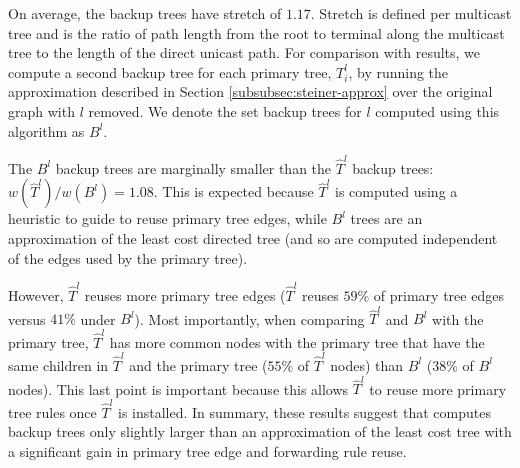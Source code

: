 On average, the \steiner backup trees have stretch of $1.17$. %
Stretch is defined per multicast tree and is the ratio of path length from the root to terminal along the multicast tree to the length of the direct unicast path. 
For comparison with \steiner results, we compute a second backup tree for each primary tree, $T_i^l$, 
by running the \arbor approximation described in Section \ref{subsubsec:steiner-approx} over the original graph with $l$ removed. We denote the set backup trees for $l$ computed using this algorithm
as $B^l$. 

The $B^l$ backup trees are marginally smaller than the $\hat{T}^l$ backup trees: $w(\hat{T}^l)/w(B^l) = 1.08$.  This is expected because $\hat{T}^l$ is computed using 
a heuristic to guide \steiner to reuse primary tree edges, while $B^l$ trees are an approximation of the least cost directed tree (and so are computed independent of the edges used by the primary tree). 

However, $\hat{T}^l$ reuses more primary tree edges ($\hat{T}^l$ reuses $59\%$ of primary tree edges versus $41\%$ under $B^l$). Most importantly, when comparing $\hat{T}^l$ and $B^l$ with 
the primary tree, $\hat{T}^l$ has more common nodes with the primary tree that have the same children in $\hat{T}^l$ and the primary tree ($55\%$ of $\hat{T}^l$ nodes) 
than $B^l$ ($38\%$ of $B^l$ nodes).  
This last point is important because this allows $\hat{T}^l$ to reuse more primary tree rules once $\hat{T}^l$ is installed.
In summary, these results suggest that \steiner computes backup trees only slightly larger than an approximation of the least cost tree with a significant gain in primary tree 
edge and forwarding rule reuse. 



